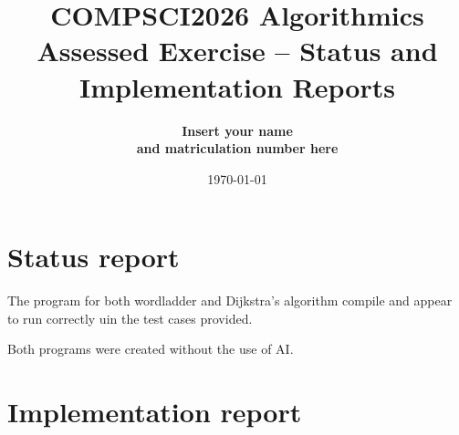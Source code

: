 \documentclass{article}
\title{COMPSCI2026 Algorithmics \\ \vspace{4mm} 
 Assessed Exercise -- Status and Implementation Reports}
\author{\bf Insert your name\\ \bf and matriculation number here}
\date{\today}
\begin{document}
 
\maketitle

\section*{Status report}

The program for both wordladder and Dijkstra's algorithm compile and appear to run correctly uin the test cases provided. 

Both programs were created without the use of AI.
\section*{Implementation report}
\end{document}
